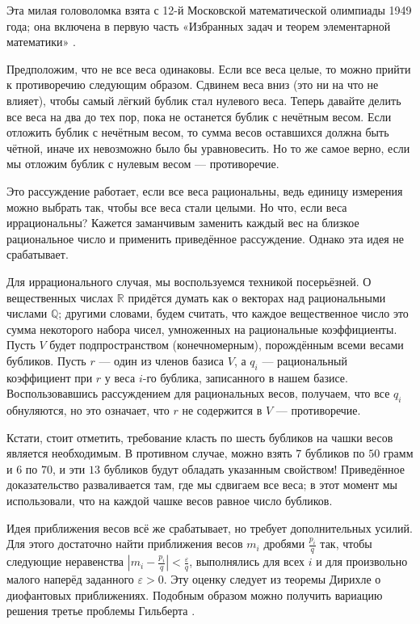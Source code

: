 Эта милая головоломка взята с 12-й Московской математической олимпиады 1949 года;
она включена в первую часть «Избранных задач и теорем элементарной математики» %
\cite[задача 127, стр. 28]{shklarsky-chentzov-yaglom}.

Предположим, что не все веса одинаковы.
Если все веса целые, то можно прийти к противоречию следующим образом.
Сдвинем веса вниз (это ни на что не влияет), чтобы самый лёгкий бублик стал нулевого веса.
Теперь давайте делить все веса на два до тех пор, пока не останется бублик с нечётным весом.
Если отложить бублик с нечётным весом, то сумма весов оставшихся должна быть чётной, иначе их невозможно было бы уравновесить.
Но то же самое верно, если мы отложим бублик с нулевым весом --- противоречие.

Это рассуждение работает, если все веса рациональны, ведь единицу измерения можно выбрать так, чтобы все веса стали целыми.
Но что, если веса иррациональны?
Кажется заманчивым заменить каждый вес на близкое рациональное число и применить приведённое рассуждение.
Однако эта идея не срабатывает.

Для иррационального случая, мы воспользуемся техникой посерьёзней.
О вещественных числах $\mathbb{R}$ придётся думать как о векторах над рациональными числами $\mathbb{Q}$;
другими словами, будем считать, что каждое вещественное число это сумма некоторого набора чисел, умноженных на рациональные коэффициенты.
Пусть $V$ будет подпространством (конечномерным), порождённым всеми весами бубликов.
Пусть $r$ --- один из членов базиса $V$, а $q_i$ --- рациональный коэффициент при $r$ у веса $i$-го бублика, записанного в нашем базисе.
Воспользовавшись рассуждением для рациональных весов, получаем, что все $q_i$ обнуляются, но это означает, что $r$ не содержится в $V$ --- противоречие.

Кстати, стоит отметить, требование класть по шесть бубликов на чашки весов является необходимым.
В противном случае, можно взять $7$ бубликов по $50$ грамм и $6$ по $70$, и эти $13$ бубликов будут обладать указанным свойством!
Приведённое доказательство разваливается там, где мы сдвигаем все веса;
в этот момент мы использовали, что на каждой чашке весов равное число бубликов.

\begin{addedbytheeditors}
Идея приближения весов всё же срабатывает, но требует дополнительных усилий.
Для этого достаточно найти приближения весов $m_i$ дробями $\tfrac{p_i}q$ так, чтобы следующие неравенства
$|m_i-\tfrac{p_i}q|<\tfrac\varepsilon q$,
выполнялись для всех $i$ и для произвольно малого наперёд заданного $\varepsilon>0$.
Эту оценку следует из теоремы Дирихле о диофантовых приближениях.
Подобным образом можно получить вариацию решения третье проблемы Гильберта \cite[Lemma 1]{benko}. 
\end{addedbytheeditors}


